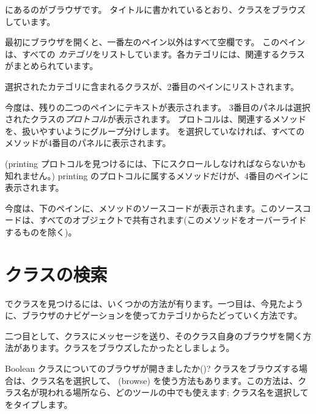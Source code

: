 \documentclass[a4paper,10pt,twoside]{book}
\begin{document}
にあるのがブラウザです。
タイトルに書かれているとおり、クラスをブラウズしています。

最初にブラウザを開くと、一番左のペイン以外はすべて空欄です。
このペインは、すべての \emph{カテゴリ}をリストしています。各カテゴリには、関連するクラスがまとめられています。

選択されたカテゴリに含まれるクラスが、2番目のペインにリストされます。

今度は、残りの二つのペインにテキストが表示されます。
3番目のパネルは選択されたクラスの\emph{プロトコル}が表示されます。
プロトコルは、関連するメソッドを、扱いやすいようにグループ分けします。
を選択していなければ、すべてのメソッドが4番目のパネルに表示されます。

(printing プロトコルを見つけるには、下にスクロールしなければならないかも知れません。)
printing のプロトコルに属するメソッドだけが、4番目のペインに表示されます。

今度は、下のペインに、メソッドのソースコードが表示されます。このソースコードは、すべてのオブジェクトで共有されます(このメソッドをオーバーライドするものを除く)。

\section{クラスの検索}

\pharo でクラスを見つけるには、いくつかの方法が有ります。一つ目は、今見たように、ブラウザのナビゲーションを使ってカテゴリからたどっていく方法です。

二つ目として、クラスにメッセージを送り、そのクラス自身のブラウザを開く方法があります。クラスをブラウズしたかったとしましょう。

Boolean クラスについてのブラウザが開きましたか()?
クラスをブラウズする場合は、クラス名を選択して、  (browse) を使う方法もあります。この方法は、クラス名が現われる場所なら、どのツールの中でも使えます;
クラス名を選択してをタイプします。
\end{document}
